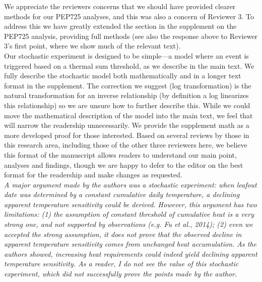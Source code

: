 \documentclass[11pt]{article}
\begin{document}
We appreciate the reviewers concerns that we should have provided clearer methods for our PEP725 analyses, and this was also a concern of Reviewer 3. To address this we have greatly extended the section in the supplement on the PEP725 analysis, providing full methods (see also the response above to Reviewer 3's first point, where we show much of the relevant text). \\

Our stochastic experiment is designed to be simple---a model where an event is triggered based on a thermal sum threshold, as we describe in the main text. We fully describe the stochastic model both mathematically and in a longer text format in the supplement. The correction we suggest (log transformation) is the natural transformation for an inverse relationship (by definition a log linearizes this relationship) so we are unsure how to further describe this. While we could move the mathematical description of the model into the main text, we feel that will narrow the readership unnecessarily. We provide the supplement math as a more developed proof for those interested. Based on several reviews by those in this research area, including those of the other three reviewers here, we believe this format of the manuscript allows readers to understand our main point, analyses and findings, though we are happy to defer to the editor on the best format for the readership and make changes as requested.\\

\emph{A major argument made by the authors was a stochastic experiment: when leafout date was determined by a constant cumulative daily temperature, a declining apparent temperature sensitivity could be derived. However, this argument has two limitations: (1) the assumption of constant threshold of cumulative heat is a very strong one, and not supported by observations (e.g. Fu et al., 2014); (2) even we accepted the strong assumption, it does not prove that the observed decline in apparent temperature sensitivity comes from unchanged heat accumulation. As the authors showed, increasing heat requirements could indeed yield declining apparent temperature sensitivity. As a reader, I do not see the value of this stochastic experiment, which did not successfully prove the points made by the author. }\\
\end{document}
